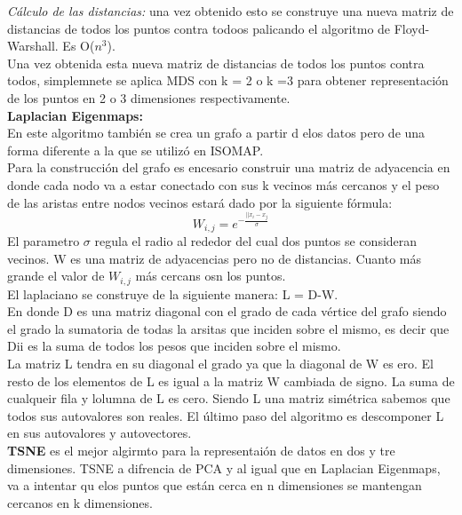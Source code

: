 \documentclass[titlepage,a4paper]{article}
\begin{document}
\textit{Cálculo de las distancias:} una vez obtenido esto se construye una nueva matriz de distancias de todos los puntos contra todoos palicando el algoritmo de Floyd-Warshall. Es O($n^3$).\\

Una vez obtenida esta nueva matriz  de distancias de todos los puntos contra todos, simplemnete se aplica MDS con k = 2 o k =3 para obtener representación de los puntos en 2 o 3 dimensiones respectivamente. \\

\textbf{Laplacian Eigenmaps:}\\

En este algoritmo también se crea un grafo a partir d elos datos pero de una forma diferente a la que se utilizó en ISOMAP. \\

Para la construcción del grafo es encesario construir una matriz de adyacencia en donde cada nodo va a estar conectado con sus k vecinos más cercanos y el peso de las aristas entre nodos vecinos estará dado por la siguiente fórmula:  
$$ W_{i,j} = e^{-\frac{||x_i - x_j}{\sigma}} $$ El parametro $\sigma$ regula el radio al rededor del cual dos puntos se consideran vecinos. W es una matriz de adyacencias pero no de distancias. Cuanto  más grande el valor de $W_{i,j}$ más cercans osn los puntos. \\

El laplaciano se construye de la siguiente manera: L = D-W. \\

En donde D es una matriz diagonal con el grado de cada vértice del grafo siendo el grado la sumatoria de todas la arsitas que inciden sobre el mismo, es decir que Dii es la suma de todos los pesos que inciden sobre el mismo. \\

La matriz L tendra en su diagonal el grado ya que la diagonal de W es ero. El resto de los elementos de L es igual a la matriz W cambiada de signo.  La suma de cualqueir fila y lolumna de L es cero. Siendo L una matriz simétrica sabemos que todos sus autovalores son reales. El último paso del algoritmo es descomponer L en sus autovalores y autovectores. \\

\textbf{TSNE} es el mejor algirmto para la representaión de datos en dos y tre dimensiones. TSNE a difrencia de PCA y al igual que en Laplacian Eigenmaps, va a intentar qu elos puntos que están cerca en n dimensiones se mantengan cercanos en k dimensiones. \\
\end{document}
